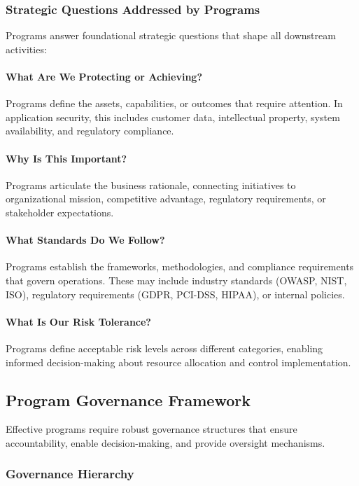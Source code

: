 \documentclass[11pt,letterpaper]{article}
\begin{document}
\subsubsection{Strategic Questions Addressed by Programs}

Programs answer foundational strategic questions that shape all downstream activities:

\paragraph{What Are We Protecting or Achieving?} Programs define the assets, capabilities, or outcomes that require attention. In application security, this includes customer data, intellectual property, system availability, and regulatory compliance.

\paragraph{Why Is This Important?} Programs articulate the business rationale, connecting initiatives to organizational mission, competitive advantage, regulatory requirements, or stakeholder expectations.

\paragraph{What Standards Do We Follow?} Programs establish the frameworks, methodologies, and compliance requirements that govern operations. These may include industry standards (OWASP, NIST, ISO), regulatory requirements (GDPR, PCI-DSS, HIPAA), or internal policies.

\paragraph{What Is Our Risk Tolerance?} Programs define acceptable risk levels across different categories, enabling informed decision-making about resource allocation and control implementation.

\subsection{Program Governance Framework}

Effective programs require robust governance structures that ensure accountability, enable decision-making, and provide oversight mechanisms.

\subsubsection{Governance Hierarchy}
\end{document}
